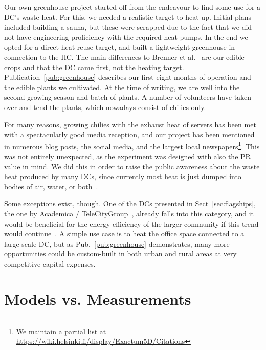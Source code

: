 \documentclass[officiallayout]{tktla}
\begin{document}
Our own greenhouse project started off from the endeavour to find some use for
a DC's waste heat. For this, we needed a realistic target to heat up.
Initial plans included building a sauna, but these were scrapped due to the
fact that we did not have engineering proficiency with the required heat
pumps. In the end we opted for a direct heat reuse target, and built a
lightweight greenhouse in connection to the HC. The main differences to
Brenner et al.~\cite{Brenner2009} are our edible crops and that the DC came
first, not the heating target.  Publication~\ref{pub:greenhouse} describes our
first eight months of operation and the edible plants we cultivated. At the
time of writing, we are well into the second growing season and batch of
plants. A number of volunteers have taken over and tend the plants, which
nowadays consist of chilies only.

For many reasons, growing chilies with the exhaust heat of servers has been
met with a spectacularly good media reception, and our project has been
mentioned in numerous blog posts, the social media, and the largest local
newspapers\footnote{We maintain a partial list at
\url{https://wiki.helsinki.fi/display/Exactum5D/Citations}}. This was not
entirely unexpected, as the experiment was designed with also the PR value in
mind. We did this in order to raise the public awareness about the waste heat
produced by many DCs, since currently most heat is just dumped into bodies of
air, water, or both~\cite{Hamilton2010}.

Some exceptions exist, though. One of the DCs presented in
Sect~\ref{sec:flagships}, the one by Academica /
TeleCityGroup~\cite{Uptime2010}, already falls into this category, and it
would be beneficial for the energy efficiency of the larger community if this
trend would continue~\cite{Brunschwiler2009,Meijer2009,Liu2011,Miller2011a}.
A simple use case is to heat the office space connected to a large-scale DC,
but as Pub.~\ref{pub:greenhouse} demonstrates, many more opportunities could
be custom-built in both urban and rural areas at very competitive capital
expenses.




\section{Models vs. Measurements}
\label{sec:costs}
\end{document}
